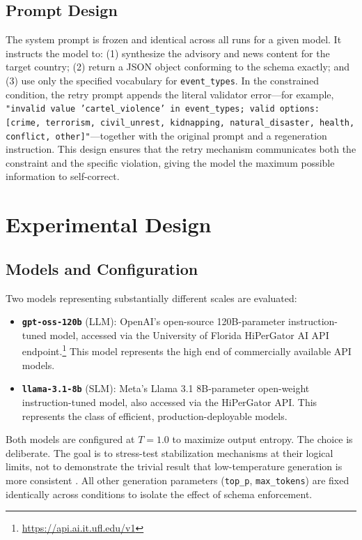 \documentclass[sigconf]{acmart}
\begin{document}
\subsection{Prompt Design}

The system prompt is frozen and identical across all runs for a given model. It instructs the model to: (1) synthesize the advisory and news content for the target country; (2) return a JSON object conforming to the schema exactly; and (3) use only the specified vocabulary for \texttt{event\_types}. In the constrained condition, the retry prompt appends the literal validator error---for example, \texttt{"invalid value 'cartel\_violence' in event\_types; valid options: [crime, terrorism, civil\_unrest, kidnapping, natural\_disaster, health, conflict, other]"}---together with the original prompt and a regeneration instruction. This design ensures that the retry mechanism communicates both the constraint and the specific violation, giving the model the maximum possible information to self-correct.
\section{Experimental Design}
\label{sec:design}

\subsection{Models and Configuration}

Two models representing substantially different scales are evaluated:

\begin{itemize}
  \item \textbf{\texttt{gpt-oss-\allowbreak 120b}} (LLM): OpenAI's open-source 120B-parameter instruction-tuned model, accessed via the University of Florida HiPerGator AI API endpoint.\footnote{\url{https://api.ai.it.ufl.edu/v1}} This model represents the high end of commercially available API models.
  \item \textbf{\texttt{llama-3.1-\allowbreak 8b}} (SLM): Meta's Llama 3.1 8B-parameter open-weight instruction-tuned model, also accessed via the HiPerGator API. This represents the class of efficient, production-deployable models.
\end{itemize}

Both models are configured at $T{=}1.0$ to maximize output entropy. The choice is deliberate. The goal is to stress-test stabilization mechanisms at their logical limits, not to demonstrate the trivial result that low-temperature generation is more consistent \cite{atil2024nondeterminism}. All other generation parameters (\texttt{top\_p}, \texttt{max\_tokens}) are fixed identically across conditions to isolate the effect of schema enforcement.
\end{document}
